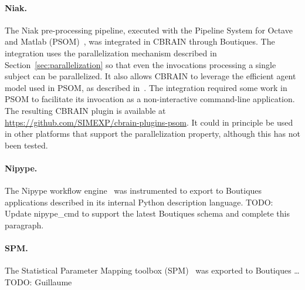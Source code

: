 \documentclass{article}
\newcommand{\todo}[1]{\color{red}TODO: #1\color{black}}
\newcommand{\boutiques}{Boutiques\xspace}
\begin{document}
\paragraph{Niak.} The Niak pre-processing pipeline, executed with the Pipeline System
for Octave and Matlab (PSOM)~\cite{bellec2012pipeline}, was integrated
in CBRAIN through \boutiques. The integration uses the parallelization
mechanism described in Section~\ref{sec:parallelization} so that even
the invocations processing a single subject can be parallelized. It also
allows CBRAIN to leverage the efficient agent model used in PSOM, as
described in~\cite{GLAT-16}. The integration required some work in
PSOM to facilitate its invocation as a non-interactive command-line
application. The resulting CBRAIN plugin is available at
\url{https://github.com/SIMEXP/cbrain-plugins-psom}. It could in
principle be used in other platforms that support the parallelization
property, although this has not been tested.

\paragraph{Nipype.} The Nipype workflow engine~\cite{gorgolewski2011nipype} was
instrumented to export to \boutiques applications described in its
internal Python description language. \todo{Update nipype\_cmd to
  support the latest \boutiques schema and complete this paragraph.}

\paragraph{SPM.} The Statistical Parameter Mapping toolbox (SPM)~\cite{penny2011statistical}
was exported to Boutiques \ldots \todo{Guillaume}
\end{document}
